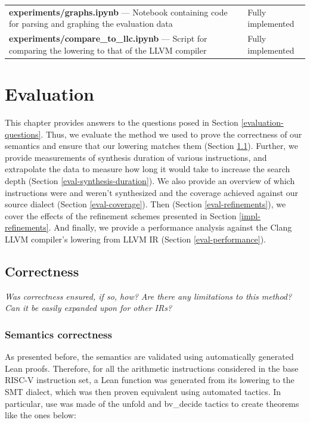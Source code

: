 \begin{table}[htbp]
\begin{tabular}{p{9cm}p{6cm}}
\midrule
\textbf{experiments/graphs.ipynb} --- Notebook containing code for parsing and graphing the evaluation data & Fully implemented \\
\textbf{experiments/compare\_to\_llc.ipynb} --- Script for comparing the lowering to that of the LLVM compiler & Fully implemented \\

\bottomrule
\end{tabular}
\label{tab:xdsl_smt_overview}
\end{table}


\clearpage
\chapter{Evaluation}

This chapter provides answers to the questions posed in Section \ref{evaluation-questions}.
Thus, we evaluate the method we used to prove the correctness of our semantics and ensure that our lowering matches them 
(Section \ref{eval-correctness}). Further, we provide measurements of synthesis duration of various instructions, 
and extrapolate the data to measure how long it would take to increase the search depth 
(Section \ref{eval-synthesis-duration}). We also provide an overview of which instructions were 
and weren't synthesized and the coverage achieved against our source dialect (Section 
\ref{eval-coverage}). Then (Section \ref{eval-refinements}), we cover the effects of the
refinement schemes presented in Section \ref{impl-refinements}. And finally, we provide a performance 
analysis against the Clang LLVM compiler's lowering from LLVM IR (Section \ref{eval-performance}).
\label{ch:eval}
\section{Correctness}
\label{eval-correctness}

\emph{Was correctness ensured, if so, how? Are there any limitations to this method? Can
it be easily expanded upon for other IRs?}

\subsection{Semantics correctness}

As presented before, the semantics are validated using automatically generated Lean proofs.
Therefore, for all the arithmetic instructions considered in the base RISC-V instruction set,
a Lean function was generated from its lowering to the SMT dialect, which was then proven
equivalent using automated tactics. In particular, use was made of the unfold and 
bv\_decide tactics to create theorems like the ones below:

